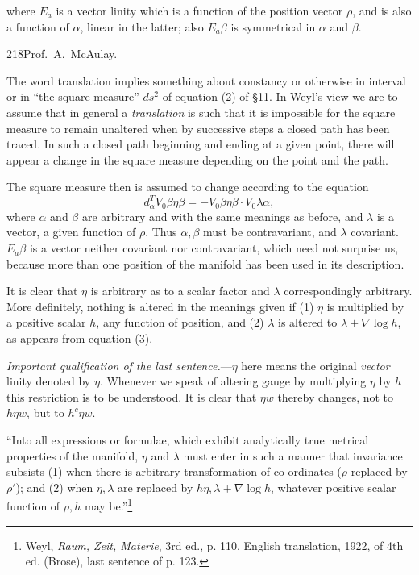 \documentclass[11pt]{article}
\begin{document}
where $E_a$ is a vector linity which is a function of the position vector $\rho$, and is also a function of $\alpha$, linear in the latter; also $E_a\beta$ is symmetrical in $\alpha$ and $\beta$.
\newpage\thispagestyle{empty}\begin{center}218\hfill Prof.\ A.\ McAulay.\end{center}
The word translation implies something about constancy or otherwise in interval or in ``the square measure'' $ds^2$ of equation (2) of §11. In Weyl's view we are to assume that in general a \emph{translation} is such that it is impossible for the square measure to remain unaltered when by successive steps a closed path has been traced. In such a closed path beginning and ending at a given point, there will appear a change in the square measure depending on the point and the path.

\indent The square measure then is assumed to change according to the equation
\begin{equation}d_\alpha^T V_0\beta\eta\beta=-V_0\beta\eta\beta\cdot V_0\lambda\alpha,\tag{3}\end{equation}
where $\alpha$ and $\beta$ are arbitrary and with the same meanings as before, and $\lambda$ is a vector, a given function of $\rho$. Thus $\alpha,\beta$ must be contravariant, and $\lambda$ covariant. $E_a\beta$ is a vector neither covariant nor contravariant, which need not surprise us, because more than one position of the manifold has been used in its description.

\indent It is clear that $\eta$ is arbitrary as to a scalar factor and $\lambda$ correspondingly arbitrary. More definitely, nothing is altered in the meanings given if (1) $\eta$ is multiplied by a positive scalar $h$, any function of position, and (2) $\lambda$ is altered to $\lambda+\nabla\log h$, as appears from equation (3).

\indent \emph{Important qualification of the last sentence.}---$\eta$ here means the original \emph{vector} linity denoted by $\eta$. Whenever we speak of altering gauge by multiplying $\eta$ by $h$ this restriction is to be understood. It is clear that $\eta w$ thereby changes, not to $h\eta w$, but to $h^c\eta w$.

\indent ``Into all expressions or formulae, which exhibit analytically true metrical properties of the manifold, $\eta$ and $\lambda$ must enter in such a manner that invariance subsists (1) when there is arbitrary transformation of co-ordinates ($\rho$ replaced by $\rho'$); and (2) when $\eta,\lambda$ are replaced by $h\eta,\lambda+\nabla\log h$, whatever positive scalar function of $\rho,h$ may be.''\footnote{Weyl, \emph{Raum, Zeit, Materie}, 3rd ed., p. 110. English translation, 1922, of 4th ed. (Brose), last sentence of p. 123.}
\end{document}
